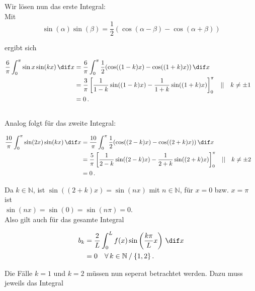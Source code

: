 \newpage

Wir lösen nun das erste Integral: \\

Mit 
\begin{equation*}
    \sin(α) \sin(β) = \frac{1}{2}(\cos(α-β) - \cos(α+β))
\end{equation*}

ergibt sich

\begin{align*}
    \frac{6}{\pi} \int_0^\pi \sin x \sin (kx) \,\dif x &=  \frac{6}{\pi} \int_0^\pi \frac{1}{2} (\cos((1-k)x) - \cos((1+k)x)) \,\dif x \\
                                                     &=  \frac{3}{\pi} \left[\frac{1}{1-k}\sin((1-k)x) - \frac{1}{1+k} \sin((1+k)x)\right]_0^\pi && || \quad k \neq \pm 1 \\
                                                     &= 0 \,.
\end{align*} \\

Analog folgt für das zweite Integral: 

\begin{align*}
    \frac{10}{\pi} \int_0^\pi \sin (2x) \sin (kx) \,\dif x &=     \frac{10}{\pi} \int_0^\pi \frac{1}{2} (\cos((2-k)x) - \cos((2+k)x)) \,\dif x \\
                                                         &=     \frac{5}{\pi} \left[\frac{1}{2-k} \sin((2-k)x) - \frac{1}{2+k} \sin((2+k)x)\right]_0^\pi && || \quad k \neq \pm 2 \\
                                                         &=     0 \,.
\end{align*}

Da $k \in \mathbb{N}$, ist $\sin((2+k)x) = \sin(nx)$ mit $n \in \mathbb{N}$, für $x=0$ bzw. $x=\pi$ ist \\ $\sin(nx) = \sin(0) = \sin(n\pi) = 0$. \\

Also gilt auch für das gesamte Integral 

\begin{align*}
    b_k &= \frac{2}{L}   \int_0^L f(x) \sin \left(\frac{k \pi}{L}x \right) \,\dif x \\
        &= 0  \quad \forall \,k \in \mathbb{N} \mathbin{/} \{1,2\} \,.
\end{align*}

Die Fälle $k = 1$ und $k = 2$ müssen nun seperat betrachtet werden.
Dazu muss jeweils das Integral


